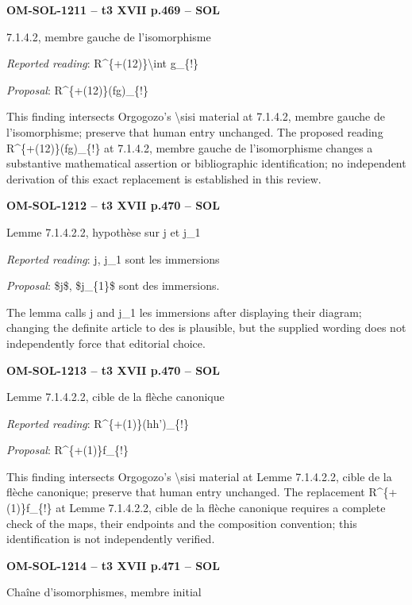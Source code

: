 \par\noindent\textbf{OM-SOL-1211 -- t3 XVII p.469 -- SOL}\par
7.1.4.2, membre gauche de l'isomorphisme\par
\emph{Reported reading}: R\textasciicircum{}\{+(12)\}\textbackslash{}int g\_\{!\}\par
\emph{Proposal}: R\textasciicircum{}\{+(12)\}(fg)\_\{!\}\par
This finding intersects Orgogozo's \textbackslash{}sisi material at 7.1.4.2, membre gauche de l'isomorphisme; preserve that human entry unchanged. The proposed reading R\textasciicircum{}\{+(12)\}(fg)\_\{!\} at 7.1.4.2, membre gauche de l'isomorphisme changes a substantive mathematical assertion or bibliographic identification; no independent derivation of this exact replacement is established in this review.\par
\par\noindent\textbf{OM-SOL-1212 -- t3 XVII p.470 -- SOL}\par
Lemme 7.1.4.2.2, hypothèse sur j et j\_1\par
\emph{Reported reading}: j, j\_1 sont les immersions\par
\emph{Proposal}: \$j\$, \$j\_\{1\}\$ sont des immersions.\par
The lemma calls j and j\_1 les immersions after displaying their diagram; changing the definite article to des is plausible, but the supplied wording does not independently force that editorial choice.\par
\par\noindent\textbf{OM-SOL-1213 -- t3 XVII p.470 -- SOL}\par
Lemme 7.1.4.2.2, cible de la flèche canonique\par
\emph{Reported reading}: R\textasciicircum{}\{+(1)\}(hh')\_\{!\}\par
\emph{Proposal}: R\textasciicircum{}\{+(1)\}f\_\{!\}\par
This finding intersects Orgogozo's \textbackslash{}sisi material at Lemme 7.1.4.2.2, cible de la flèche canonique; preserve that human entry unchanged. The replacement R\textasciicircum{}\{+(1)\}f\_\{!\} at Lemme 7.1.4.2.2, cible de la flèche canonique requires a complete check of the maps, their endpoints and the composition convention; this identification is not independently verified.\par
\par\noindent\textbf{OM-SOL-1214 -- t3 XVII p.471 -- SOL}\par
Chaîne d'isomorphismes, membre initial\par
